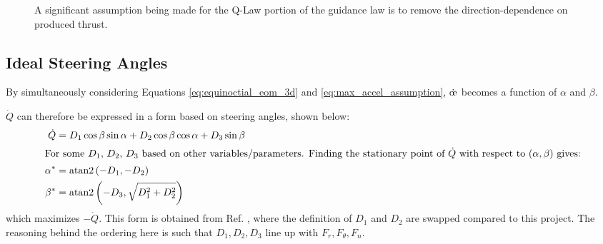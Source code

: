 \begin{figure}
    \centering
    \caption{A significant assumption being made for the Q-Law portion of the guidance law is to remove the direction-dependence on produced thrust.}
    \label{fig:thrust_curve}
\end{figure}

\subsection{Ideal Steering Angles}
By simultaneously considering Equations \ref{eq:equinoctial_eom_3d} and \ref{eq:max_accel_assumption}, \(\dot{\moe}\) becomes a function of \(\alpha\) and \(\beta\).

\(\dot{Q}\) can therefore be expressed in a form based on steering angles, shown below:
\begin{align}
    \dot{Q}  & = D_1 \cos \beta \sin \alpha + D_2 \cos \beta \cos \alpha + D_3 \sin \beta \label{eq:q_dot_angles_form} \\
    \intertext{For some \(D_1\), \(D_2\), \(D_3\) based on other variables/parameters. Finding the stationary point of \(\dot{Q}\) with respect to \((\alpha, \beta)\) gives:}
    \alpha^* & = \mathrm{atan2}\left(-D_1, -D_2\right) \label{eq:alpha_star}                                           \\
    \beta^*  & = \mathrm{atan2}\left(-D_3, \sqrt{D_1^2 + D_2^2}\right) \label{eq:beta_star}
\end{align}
which maximizes \(-\dot{Q}\). This form is obtained from Ref. \cite{vargaperez2016}, where the definition of \(D_1\) and \(D_2\) are swapped compared to this project. The reasoning behind the ordering here is such that \(D_1, D_2, D_3\) line up with \(F_r, F_\theta, F_n\).

